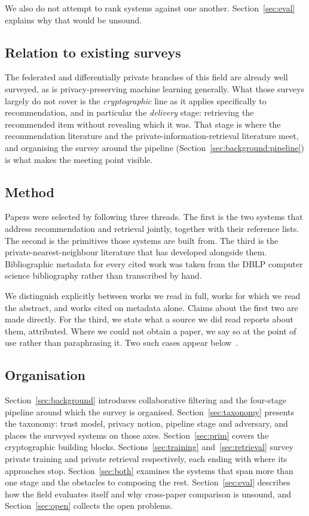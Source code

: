 We also do not attempt to rank systems against one another. Section~\ref{sec:eval} explains why
that would be unsound.

\subsection{Relation to existing surveys}
\label{sec:intro:related}

The federated and differentially private branches of this field are already well surveyed, as is
privacy-preserving machine learning generally. What those surveys largely do not cover is the
\emph{cryptographic} line as it applies specifically to recommendation, and in particular the
\emph{delivery} stage: retrieving the recommended item without revealing which it was. That
stage is where the recommendation literature and the private-information-retrieval literature meet,
and organising the survey around the pipeline (Section~\ref{sec:background:pipeline}) is what makes
the meeting point visible.

\subsection{Method}
\label{sec:intro:method}

Papers were selected by following three threads. The first is the two systems that address
recommendation and retrieval jointly, together with their reference lists. The second is the
primitives those systems are built from. The third is the private-nearest-neighbour literature
that has developed alongside them. Bibliographic metadata for
every cited work was taken from the DBLP computer science bibliography rather than transcribed by
hand.

We distinguish explicitly between works we read in full, works for which we read the abstract, and
works cited on metadata alone. Claims about the first two are made directly. For the third, we
state what a source we did read reports about them, attributed. Where we could not obtain a paper,
we say so at the point of use rather than paraphrasing it. Two such cases appear
below~\cite{calandrino2011,nikolaenko2013}.

\subsection{Organisation}
\label{sec:intro:organisation}

Section~\ref{sec:background} introduces collaborative filtering and the four-stage pipeline around
which the survey is organised. Section~\ref{sec:taxonomy} presents the taxonomy: trust model,
privacy notion, pipeline stage and adversary, and places the surveyed systems on those axes.
Section~\ref{sec:prim} covers the cryptographic building blocks.
Sections~\ref{sec:training} and~\ref{sec:retrieval} survey private training and private retrieval
respectively, each ending with where its approaches stop. Section~\ref{sec:both} examines the
systems that span more than one stage and the obstacles to composing the rest.
Section~\ref{sec:eval} describes how the field evaluates itself and why cross-paper comparison is
unsound, and Section~\ref{sec:open} collects the open problems.

